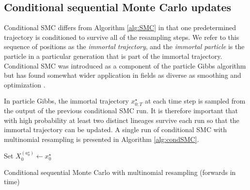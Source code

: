 \documentclass{article} %
\theoremstyle{definition}
\newcommand{\1}[1]{\mathbbm{1}_{\{#1\}}}
\begin{document}
\subsection{Conditional sequential Monte Carlo updates}

Conditional SMC differs from Algorithm \ref{alg:SMC} in that one predetermined trajectory is conditioned to survive all of the resampling steps. 
We refer to this sequence of positions as the \emph{immortal trajectory}, and the \emph{immortal particle} is the particle in a particular generation that is part of the immortal trajectory.
Conditional SMC was introduced as a component of the particle Gibbs algorithm \cite{andrieu2010} but has found somewhat wider application in fields as diverse as smoothing \cite{jacob19,shestopaloff19} and optimization \cite[Chapter 6]{finke15}. 

In particle Gibbs, the immortal trajectory $x_{0:T}^\star$ at each time step is sampled from the output of the previous conditional SMC run. It is therefore important that with high probability at least two distinct lineages survive each run so that the immortal trajectory can be updated.
A single run of conditional SMC with multinomial resampling is presented in Algorithm \ref{alg:condSMC}.

\vspace{10pt}
\begin{algorithm}[H]
\DontPrintSemicolon
{}
Set $X_0^{(a_0^\star)} \gets x_0^\star$\;
\caption{Conditional sequential Monte Carlo with multinomial resampling (forwards in time)}
\label{alg:condSMC}
\end{algorithm}
\vspace{10pt}
\end{document}
